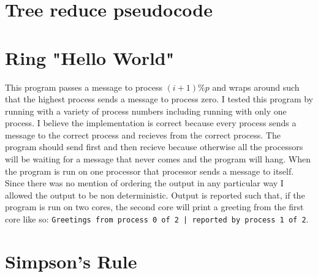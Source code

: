\documentclass[a4paper,12pt]{article}
\begin{document}
\section{Tree reduce pseudocode}



\section{Ring "Hello World"}

This program passes a message to process $ (i+1) \%p $ and wraps around such that the highest process sends a message to process zero.  I tested this program by running with a variety of process numbers including running with only one process.  I believe the implementation is correct because every process sends a message to the correct process and recieves from the correct process.  The program should send first and then recieve because otherwise all the processors will be waiting for a message that never comes and the program will hang.  When the program is run on one processor that processor sends a message to itself.  Since there was no mention of ordering the output in any particular way I allowed the output to be non deterministic.  Output is reported such that, if the program is run on two cores, the second core will print a greeting from the first core like so:  \texttt{Greetings from process 0 of 2 | reported by process 1 of 2}.

\section{Simpson's Rule}
\end{document}
